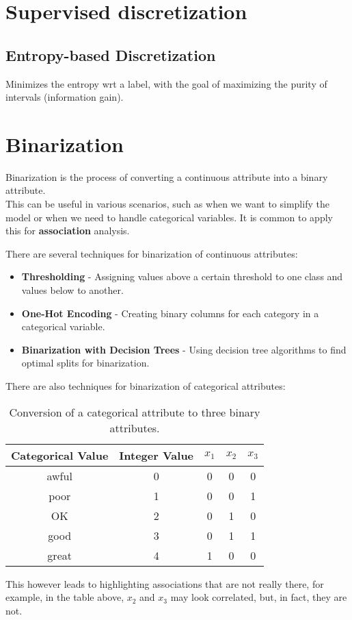 \section{Supervised discretization}


\subsection{Entropy-based Discretization}
Minimizes the entropy wrt a label, with the goal of maximizing the purity of intervals (information gain).

\section{Binarization}
Binarization is the process of converting a continuous attribute into a binary attribute.\\
This can be useful in various scenarios, such as when we want to simplify the model or when we need to handle categorical variables.
It is common to apply this for \textbf{association} analysis.



There are several techniques for binarization of continuous attributes:
\begin{itemize}
	\item \textbf{Thresholding} - Assigning values above a certain threshold to one class and values below to another.
	\item \textbf{One-Hot Encoding} - Creating binary columns for each category in a categorical variable.
	\item \textbf{Binarization with Decision Trees} - Using decision tree algorithms to find optimal splits for binarization.
\end{itemize}

\newpage
There are also techniques for binarization of categorical attributes:


\begin{table}[htbp]
\centering
\caption{Conversion of a categorical attribute to three binary attributes.}
\begin{tabular}{|c|c|c|c|c|}
\hline
\textbf{Categorical Value} & \textbf{Integer Value} & \textbf{$x_1$} & \textbf{$x_2$} & \textbf{$x_3$} \\
\hline
awful & 0 & 0 & 0 & 0 \\
\hline
poor & 1 & 0 & 0 & 1 \\
\hline
OK & 2 & 0 & 1 & 0 \\
\hline
good & 3 & 0 & 1 & 1 \\
\hline
great & 4 & 1 & 0 & 0 \\
\hline
\end{tabular}
\label{tab:binary_three}

This however leads to highlighting associations that are not really there, for example, in the table above, $x_2$ and $x_3$ may look correlated, but, in fact, they are not. 
\end{table}

